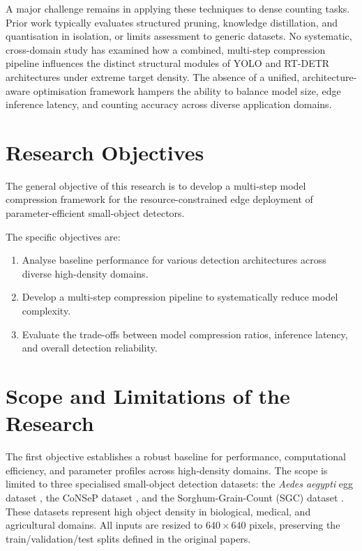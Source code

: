 A major challenge remains in applying these techniques to dense counting tasks. Prior work typically evaluates structured pruning, knowledge distillation, and quantisation in isolation, or limits assessment to generic datasets. No systematic, cross-domain study has examined how a combined, multi-step compression pipeline influences the distinct structural modules of YOLO and RT-DETR architectures under extreme target density. The absence of a unified, architecture-aware optimisation framework hampers the ability to balance model size, edge inference latency, and counting accuracy across diverse application domains.

\section{Research Objectives}

The general objective of this research is to develop a multi-step model compression framework for the resource-constrained edge deployment of parameter-efficient small-object detectors.

The specific objectives are:
\begin{enumerate}
    \item Analyse baseline performance for various detection architectures across diverse high-density domains.
    \item Develop a multi-step compression pipeline to systematically reduce model complexity.

    \item Evaluate the trade-offs between model compression ratios, inference latency, and overall detection reliability.
\end{enumerate}

\section{Scope and Limitations of the Research}
\label{sec:scopelimitations}

The first objective establishes a robust baseline for performance, computational efficiency, and parameter profiles across high-density domains. The scope is limited to three specialised small-object detection datasets: the \textit{Aedes aegypti} egg dataset \cite{vicente2024aedesaegyptieggcounting}, the CoNSeP dataset \cite{Tyagi2023}, and the Sorghum-Grain-Count (SGC) dataset \cite{Bakshi2025}. These datasets represent high object density in biological, medical, and agricultural domains. All inputs are resized to $640\times640$ pixels, preserving the train/validation/test splits defined in the original papers.

